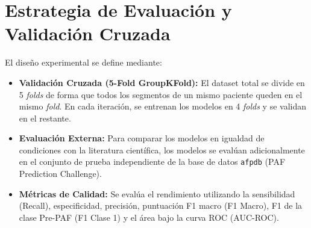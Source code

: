 \section{Estrategia de Evaluación y Validación Cruzada}
\label{sec:estrategia_evaluacion}

El diseño experimental se define mediante:
\begin{itemize}
  \item \textbf{Validación Cruzada (5-Fold GroupKFold):}
  El dataset total se divide en 5 \textit{folds} de forma que todos los segmentos de un mismo
  paciente queden en el mismo \textit{fold}. En cada iteración, se entrenan los modelos en
  4 \textit{folds} y se validan en el restante.
  \item \textbf{Evaluación Externa:}
  Para comparar los modelos en igualdad de condiciones con la literatura científica, los modelos se evalúan adicionalmente en el conjunto de prueba independiente de la base de datos \texttt{afpdb} (PAF Prediction Challenge).
  \item \textbf{Métricas de Calidad:} Se evalúa el rendimiento utilizando la sensibilidad (Recall), especificidad, precisión, puntuación F1 macro (F1 Macro), F1 de la clase Pre-PAF (F1 Clase 1) y el área bajo la curva ROC (AUC-ROC).
\end{itemize}
